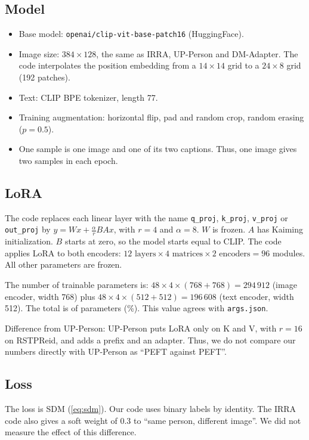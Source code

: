 \subsection{Model}
\begin{itemize}[leftmargin=1.5em]
  \item Base model: \texttt{openai/clip-vit-base-patch16} (HuggingFace).
  \item Image size: $384{\times}128$, the same as IRRA, UP-Person and DM-Adapter. The code interpolates the position embedding from a $14{\times}14$ grid to a $24{\times}8$ grid (192 patches).
  \item Text: CLIP BPE tokenizer, length 77.
  \item Training augmentation: horizontal flip, pad and random crop, random erasing ($p=0.5$).
  \item One sample is one image and one of its two captions. Thus, one image gives two samples in each epoch.
\end{itemize}

\subsection{LoRA}\label{sec:lora}
The code replaces each linear layer with the name \texttt{q\_proj}, \texttt{k\_proj}, \texttt{v\_proj} or \texttt{out\_proj} by $y=Wx+\frac{\alpha}{r}BAx$, with $r=4$ and $\alpha=8$. $W$ is frozen. $A$ has Kaiming initialization. $B$ starts at zero, so the model starts equal to CLIP. The code applies LoRA to both encoders: $12\text{ layers}\times4\text{ matrices}\times2\text{ encoders}=96$ modules. All other parameters are frozen.

The number of trainable parameters is: $48\times4\times(768+768)=294\,912$ (image encoder, width 768) plus $48\times4\times(512+512)=196\,608$ (text encoder, width 512). The total is \textbf{\numTrainable} of \numTotalParams{} parameters (\numTrainPct\%). This value agrees with \texttt{args.json}.

Difference from UP-Person: UP-Person puts LoRA only on K and V, with $r=16$ on RSTPReid, and adds a prefix and an adapter. Thus, we do not compare our numbers directly with UP-Person as ``PEFT against PEFT''.

\subsection{Loss}
The loss is SDM (\cref{eq:sdm}). Our code uses binary labels by identity. The IRRA code also gives a soft weight of 0.3 to ``same person, different image''. We did not measure the effect of this difference.


